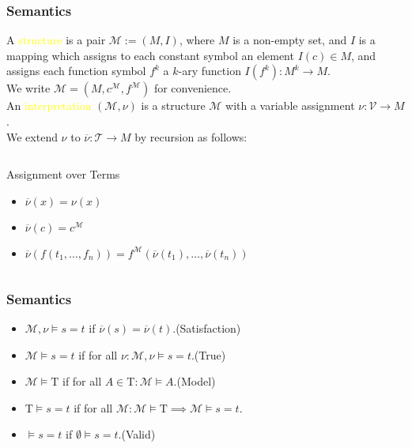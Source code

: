 \documentclass[UTF8,aspectratio=43,11pt,colorlinks,compress,openany]{beamer}%
\begin{document}
\begin{frame}\frametitle{Semantics}
	A \textcolor{yellow}{structure} is a pair $\mathcal{M}:=(M,I)$, where $M$ is a non-empty set, and $I$ is a mapping which assigns to each constant symbol an element $I(c)\in M$, and assigns each function symbol $f^k$ a $k$-ary function $I(f^k): M^k\to M$.\\
	We write $\mathcal{M}=\left(M,c^{\mathcal{M}},f^{\mathcal{M}}\right)$ for convenience.\\
	An \textcolor{yellow}{interpretation} $(\mathcal{M},\nu)$ is a structure $\mathcal{M}$ with a variable assignment $\nu:\mathcal{V}\to M$.\\
	We extend $\nu$ to $\overline{\nu}:\mathcal{T}\to M$ by recursion as follows:
	\begin{columns}[onlytextwidth]
			\begin{block}{Assignment over Terms}
				\begin{itemize}
					\item $\overline{\nu}(x)=\nu(x)$
					\item $\overline{\nu}(c)=c^{\mathcal{M}}$
					\item $\overline{\nu}(f(t_1,\dots,f_n))=f^{\mathcal{M}}(\overline{\nu}(t_1),\dots,\overline{\nu}(t_n))$
				\end{itemize}
			\end{block}
	\end{columns}
\end{frame}

\begin{frame}\frametitle{Semantics}
	\begin{block}{}
		\begin{itemize}
			\item $\mathcal{M},\nu\vDash s=t$ if $\overline{\nu}(s)=\overline{\nu}(t)$.\hfill (Satisfaction)
			\item $\mathcal{M}\vDash s=t$ if for all $\nu: \mathcal{M},\nu\vDash s=t$.\hfill (True)
			\item $\mathcal{M}\vDash\mathrm{T}$ if for all $A\in\mathrm{T}: \mathcal{M}\vDash A$.\hfill (Model)
			\item $\mathrm{T}\vDash s=t$ if for all $\mathcal{M}: \mathcal{M}\vDash\mathrm{T}\implies\mathcal{M}\vDash s=t$.
			\item $\vDash s=t$ if $\emptyset\vDash s=t$.\hfill (Valid)
		\end{itemize}
	\end{block}
\end{frame}
\end{document}
